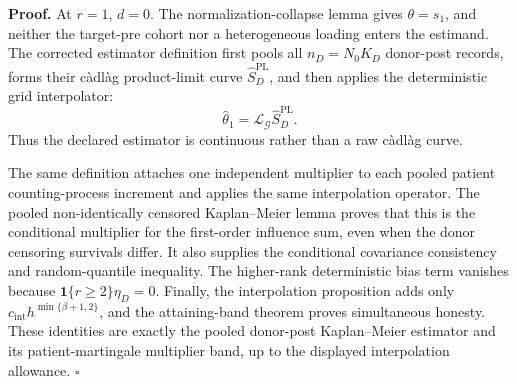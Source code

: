 \textbf{Proof.}
At \(r=1\), \(d=0\).  The normalization-collapse lemma gives
\(\theta=s_1\), and neither the target-pre cohort nor a heterogeneous
loading enters the estimand.  The corrected estimator definition first
pools all \(n_D=N_0K_D\) donor-post records, forms their c\`adl\`ag
product-limit curve \(\widehat S_D^{\mathrm{PL}}\), and then applies the
deterministic grid interpolator:
\[
 \widehat\theta_1=\mathcal L_{\mathcal G}
                    \widehat S_D^{\mathrm{PL}}.             \tag{1}
\]
Thus the declared estimator is continuous rather than a raw c\`adl\`ag
curve.

The same definition attaches one independent multiplier to each pooled
patient counting-process increment and applies the same interpolation
operator.  The pooled non-identically censored Kaplan--Meier lemma proves
that this is the conditional multiplier for the first-order influence sum,
even when the donor censoring survivals differ.  It also supplies the
conditional covariance consistency and random-quantile inequality.  The
higher-rank deterministic bias term vanishes because
\(\mathbf1\{r\ge2\}\eta_D=0\).  Finally, the interpolation proposition
adds only \(c_{\mathrm{int}}h^{\min\{\beta+1,2\}}\), and the attaining-band
theorem proves simultaneous honesty.  These identities are exactly the
pooled donor-post Kaplan--Meier estimator and its patient-martingale
multiplier band, up to the displayed interpolation allowance. \(\square\)